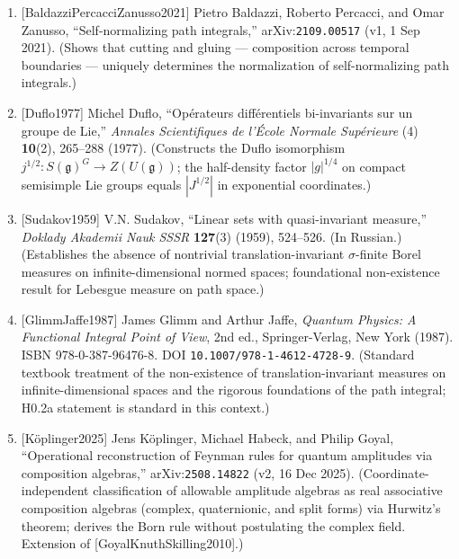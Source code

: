 \documentclass[
]{article}
\begin{document}
\begin{enumerate}
  semigroup/composition property of the path integral; direct precedent
  for P4.2's composition-forced normalization.)
\item
  {[}BaldazziPercacciZanusso2021{]} Pietro Baldazzi, Roberto Percacci,
  and Omar Zanusso, ``Self-normalizing path integrals,''
  arXiv:\texttt{2109.00517} (v1, 1 Sep 2021). (Shows that cutting and
  gluing --- composition across temporal boundaries --- uniquely
  determines the normalization of self-normalizing path integrals.)
\item
  {[}Duflo1977{]} Michel Duflo, ``Opérateurs différentiels bi-invariants
  sur un groupe de Lie,'' \emph{Annales Scientifiques de l'École Normale
  Supérieure} (4) \textbf{10}(2), 265--288 (1977). (Constructs the Duflo
  isomorphism \(j^{1/2}\colon S(\mathfrak{g})^G\to Z(U(\mathfrak{g}))\);
  the half-density factor \(|g|^{1/4}\) on compact semisimple Lie groups
  equals \(|J^{1/2}|\) in exponential coordinates.)
\item
  {[}Sudakov1959{]} V.N. Sudakov, ``Linear sets with quasi-invariant
  measure,'' \emph{Doklady Akademii Nauk SSSR} \textbf{127}(3) (1959),
  524--526. (In Russian.) (Establishes the absence of nontrivial
  translation-invariant \(\sigma\)-finite Borel measures on
  infinite-dimensional normed spaces; foundational non-existence result
  for Lebesgue measure on path space.)
\item
  {[}GlimmJaffe1987{]} James Glimm and Arthur Jaffe, \emph{Quantum
  Physics: A Functional Integral Point of View}, 2nd ed.,
  Springer-Verlag, New York (1987). ISBN 978-0-387-96476-8. DOI
  \texttt{10.1007/978-1-4612-4728-9}. (Standard textbook treatment of
  the non-existence of translation-invariant measures on
  infinite-dimensional spaces and the rigorous foundations of the path
  integral; H0.2a statement is standard in this context.)
\item
  {[}Köplinger2025{]} Jens Köplinger, Michael Habeck, and Philip Goyal,
  ``Operational reconstruction of Feynman rules for quantum amplitudes
  via composition algebras,'' arXiv:\texttt{2508.14822} (v2, 16 Dec
  2025). (Coordinate-independent classification of allowable amplitude
  algebras as real associative composition algebras (complex,
  quaternionic, and split forms) via Hurwitz's theorem; derives the Born
  rule without postulating the complex field. Extension of
  {[}GoyalKnuthSkilling2010{]}.)
\end{enumerate}
\end{document}

